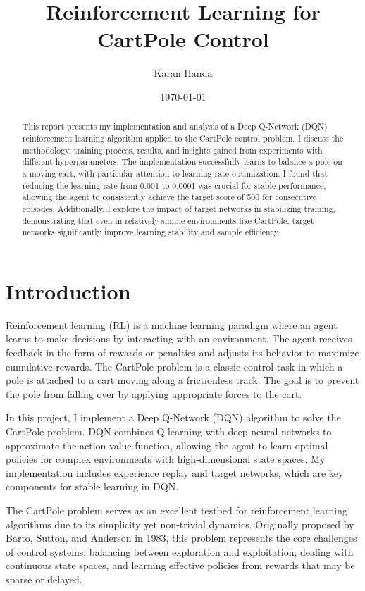 \documentclass{article}
\title{Reinforcement Learning for CartPole Control}
\author{Karan Handa}
\date{\today}
\begin{document}
\maketitle

\begin{abstract}
This report presents my implementation and analysis of a Deep Q-Network (DQN) reinforcement learning algorithm applied to the CartPole control problem. I discuss the methodology, training process, results, and insights gained from experiments with different hyperparameters. The implementation successfully learns to balance a pole on a moving cart, with particular attention to learning rate optimization. I found that reducing the learning rate from 0.001 to 0.0001 was crucial for stable performance, allowing the agent to consistently achieve the target score of 500 for consecutive episodes. Additionally, I explore the impact of target networks in stabilizing training, demonstrating that even in relatively simple environments like CartPole, target networks significantly improve learning stability and sample efficiency.
\end{abstract}

\section{Introduction}
Reinforcement learning (RL) is a machine learning paradigm where an agent learns to make decisions by interacting with an environment. The agent receives feedback in the form of rewards or penalties and adjusts its behavior to maximize cumulative rewards. The CartPole problem is a classic control task in which a pole is attached to a cart moving along a frictionless track. The goal is to prevent the pole from falling over by applying appropriate forces to the cart.

In this project, I implement a Deep Q-Network (DQN) algorithm to solve the CartPole problem. DQN combines Q-learning with deep neural networks to approximate the action-value function, allowing the agent to learn optimal policies for complex environments with high-dimensional state spaces. My implementation includes experience replay and target networks, which are key components for stable learning in DQN.

The CartPole problem serves as an excellent testbed for reinforcement learning algorithms due to its simplicity yet non-trivial dynamics. Originally proposed by Barto, Sutton, and Anderson in 1983, this problem represents the core challenges of control systems: balancing between exploration and exploitation, dealing with continuous state spaces, and learning effective policies from rewards that may be sparse or delayed.
\end{document}
